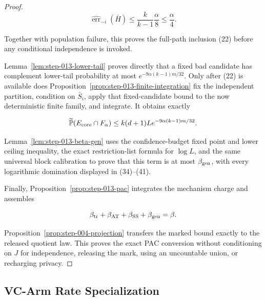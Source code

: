 \begin{proof}
\[
 \widehat{\operatorname{err}}_{-i}(\bar H)
 \leq\frac{k}{k-1}\frac\alpha8\leq\frac\alpha4.
\]

Together with population failure, this proves the full-path inclusion (22)
before any conditional independence is invoked.

Lemma~\ref{lem:step-013-lower-tail} proves directly that a fixed bad
candidate has complement lower-tail probability at most
\(e^{-9\alpha(k-1)m/32}\). Only after (22) is available does
Proposition~\ref{prop:step-013-finite-integration} fix the independent
partition, condition on \(\bar S_i\), apply that fixed-candidate bound to
the now deterministic finite family, and integrate. It obtains exactly

\[
 \widetilde{\mathbb P}(E_{\rm core}\cap F_\alpha)
 \leq k(d+1)L e^{-9\alpha(k-1)m/32}.
\]

Lemma~\ref{lem:step-013-beta-gen} uses the confidence-budget fixed point and
lower ceiling inequality, the exact restriction-list formula for \(\log L\), and
the same universal block calibration to prove that this term is at most
\(\beta_{\rm gen}\), with every logarithmic domination displayed in
(34)--(41).

Finally, Proposition~\ref{prop:step-013-pac} integrates the 
mechanism charge and assembles

\[
 \beta_{\rm tr}+\beta_{\rm AT}+\beta_{\rm SS}+\beta_{\rm gen}=\beta.
\]

Proposition~\ref{prop:step-004-projection} transfers the marked
bound exactly to the released quotient law. This proves the exact PAC
conversion without conditioning on \(J\) for independence, releasing the
mark, using an uncountable union, or recharging privacy.



\end{proof}

\subsection{VC-Arm Rate Specialization}\label{app:step_014}

